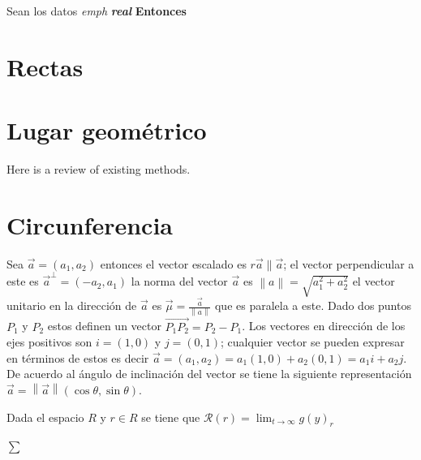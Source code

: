 \documentclass[12pt,]{report}
\theoremstyle{slplain}
\let\BeginKnitrBlock\begin \let\EndKnitrBlock\end
\begin{document}
Sean los datos \emph{emph} \textbf{\emph{real}} \textbf{Entonces}

\hypertarget{intro}{%
\chapter{Rectas}\label{intro}}

\hypertarget{lugar-geomuxe9trico}{%
\chapter{Lugar geométrico}\label{lugar-geomuxe9trico}}

Here is a review of existing methods.

\hypertarget{circunferencia}{%
\chapter{Circunferencia}\label{circunferencia}}

Sea \(\vec{a}=(a_1,a_2)\) entonces el vector escalado es \(r\vec{a}\parallel\vec{a}\); el vector perpendicular a este es \(\vec{a}^\perp=(-a_2,a_1)\) la norma del vector \(\vec{a}\) es \(\left\|a\right\|=\sqrt{a_1^2+a_2^2}\) el vector unitario en la dirección de \(\vec{a}\) es \(\vec{\mu}=\frac{\vec{a}}{\left\|a\right\|}\) que es paralela a este. Dado dos puntos \(P_1\) y \(P_2\) estos definen un vector \(\vec{P_1P_2}=P_2-P_1\). Los vectores en dirección de los ejes positivos son \(i=(1,0)\) y \(j=(0,1)\); cualquier vector se pueden expresar en términos de estos es decir \(\vec{a}=(a_1,a_2)=a_1(1,0)+a_2(0,1)=a_1i+a_2j\). De acuerdo al ángulo de inclinación del vector se tiene la siguiente representación \(\vec{a}=\left\|\vec{a}\right\|(\cos\theta,\sin\theta)\).

\BeginKnitrBlock{theorem}[russ]
\protect\hypertarget{thm:www}{}{\label{thm:www} {} }Dada el espacio \(R\) y \(r\in R\) se tiene que \(\mathcal{R}(r)=\lim_{t\to\infty}g(y)_r\)
\EndKnitrBlock{theorem}

\(\sum\)
\end{document}
